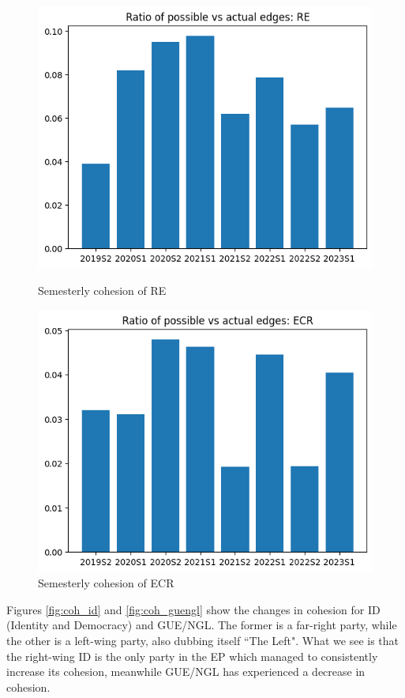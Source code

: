 \documentclass[lettersize,journal]{IEEEtran}
\begin{document}
\begin{figure}[h]
	\centering
	\begin{minipage}[b]{0.23\textwidth}
		\includegraphics[width=\textwidth]{coh_re.png}
		\caption{Semesterly cohesion of RE}
		\label{fig:coh_re}
	\end{minipage}
	\hfill
	\begin{minipage}[b]{0.23\textwidth}
		\includegraphics[width=\textwidth]{coh_ecr.png}
		\caption{Semesterly cohesion of ECR}
		\label{fig:coh_ecr}
	\end{minipage}
\end{figure}

Figures \ref{fig:coh_id} and \ref{fig:coh_guengl} show the changes in cohesion for ID (Identity and Democracy) and GUE/NGL. The former is a far-right party, while the other is a left-wing party, also dubbing itself ``The Left". What we see is that the right-wing ID is the only party in the EP which managed to consistently increase its cohesion, meanwhile GUE/NGL has experienced a decrease in cohesion.
\end{document}
